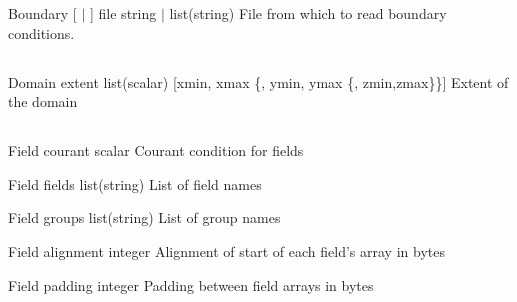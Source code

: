 \documentclass{article}
\begin{document}
\Parameter
{Boundary} 
{[  $|$  ]} 
{file} 
{string $|$ list(string)} 
{} 
{File from which to read boundary conditions.  } 
{} 
{}

\subsection{}

\Parameter
{Domain} 
{} 
{extent} 
{list(scalar)} 
{[xmin, xmax \{, ymin, ymax \{, zmin,zmax\}\}]}
{Extent of the domain} 
{} 
{}

\subsection{}

\Parameter
{Field} 
{} 
{courant} 
{scalar} 
{} 
{Courant condition for fields} 
{} 
{}

\Parameter
{Field} 
{} 
{fields} 
{list(string)} 
{} 
{List of field names} 
{} 
{}

\Parameter
{Field} 
{} 
{groups} 
{list(string)} 
{} 
{List of group names} 
{} 
{}

\Parameter
{Field}
{}
{alignment}
{integer}
{}
{Alignment of start of each field's array in bytes}
{}
{}

\Parameter
{Field}
{}
{padding}
{integer}
{}
{Padding between field arrays in bytes}
{}
{}
\end{document}
